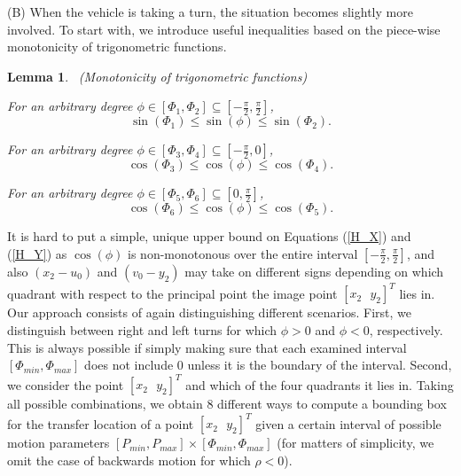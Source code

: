 \documentclass[letterpaper, 10 pt, conference]{ieeeconf}  %
\newtheorem{lemma}{Lemma}
\begin{document}
(B) When the vehicle is taking a turn, the situation becomes slightly more involved. To start with, we introduce useful inequalities based on the piece-wise monotonicity of trigonometric functions.

\begin{lemma} \ 
\textit{(Monotonicity of trigonometric functions)}

For an arbitrary degree $\phi \in [\Phi_1, \Phi_2] \subseteq [-\frac{\pi}{2}, \frac{\pi}{2}]$, 
\begin{equation}
	\sin(\Phi_1) \le \sin(\phi) \le \sin(\Phi_2).
\end{equation}

For an arbitrary degree $\phi \in [\Phi_3, \Phi_4] \subseteq [-\frac{\pi}{2}, 0]$, 
\begin{equation}
	\cos(\Phi_3) \le \cos(\phi) \le \cos(\Phi_4).
\end{equation}

For an arbitrary degree $\phi \in [\Phi_5, \Phi_6] \subseteq [0, \frac{\pi}{2}]$, 
\begin{equation}
	\cos(\Phi_6) \le \cos(\phi) \le \cos(\Phi_5).
\end{equation}
\end{lemma}

It is hard to put a simple, unique upper bound on Equations (\ref{H_X}) and (\ref{H_Y}) as $\cos(\phi)$ is non-monotonous over the entire interval $[-\frac{\pi}{2}, \frac{\pi}{2}]$, and also $(x_2-u_0)$ and $(v_0-y_2)$ may take on different signs depending on which quadrant with respect to the principal point the image point $[x_2 \text{ } y_2]^T$ lies in. Our approach consists of again distinguishing different scenarios. First, we distinguish between right and left turns for which $\phi>0$ and $\phi<0$, respectively. This is always possible if simply making sure that each examined interval $[\Phi_{min},\Phi_{max}]$ does not include 0 unless it is the boundary of the interval. Second, we consider the point $[x_2 \text{ } y_2]^T$ and which of the four quadrants it lies in. Taking all possible combinations, we obtain 8 different ways to compute a bounding box for the transfer location of a point $[x_2 \text{ } y_2]^T$ given a certain interval of possible motion parameters $[P_{min},P_{max}]\times[\Phi_{min},\Phi_{max}]$ (for matters of simplicity, we omit the case of backwards motion for which $\rho < 0$).
\end{document}
